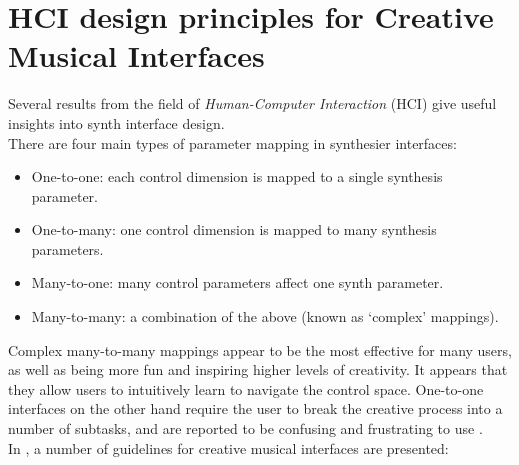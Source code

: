 \documentclass[11pt, oneside]{report}   	%
\begin{document}
\section{HCI design principles for Creative Musical Interfaces}\label{sec:Tubb}
Several results from the field of \emph{Human-Computer Interaction} (HCI) give useful insights into synth interface design.\\
There are four main types of parameter mapping in synthesier interfaces:
\begin{itemize}
\vspace{-10pt}
\setlength\itemsep{-1.2em}
\item One-to-one: each control dimension is mapped to a single synthesis parameter.
\item One-to-many: one control dimension is mapped to many synthesis parameters.
\item Many-to-one: many control parameters affect one synth parameter.
\item Many-to-many: a combination of the above (known as ‘complex’ mappings).
\end{itemize}
\vspace{-10pt}
Complex many-to-many mappings appear to be the most effective for many users, as well as being more fun and inspiring higher levels of creativity. It appears that they allow users to intuitively learn to navigate the control space. One-to-one interfaces on the other hand require the user to break the creative process into a number of subtasks, and are reported to be confusing and frustrating to use \cite{MappingStrategies}.\\
%
In \cite{TubbThesis}, a number of guidelines for creative musical interfaces are presented:
\end{document}
